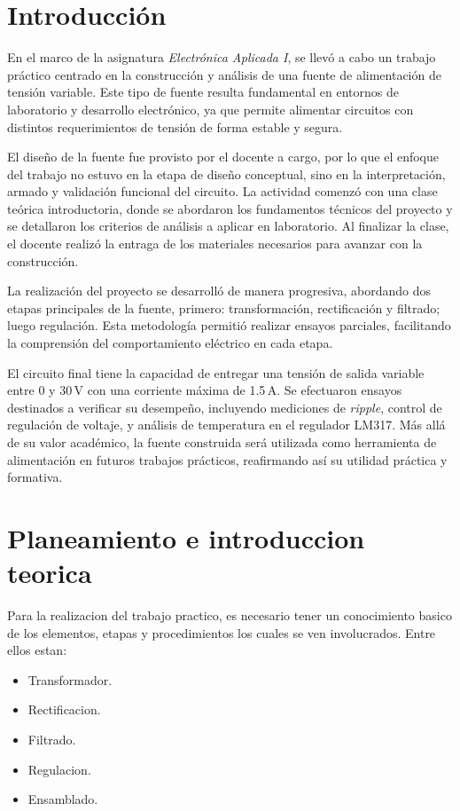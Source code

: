 \documentclass[chaptersright]{informeutn}
\begin{document}
  \maketitle

  \tableofcontents
  \setcounter{page}{1}
  \thispagestyle{plain}

  \chapter{Introducción} 

    En el marco de la asignatura \textit{Electrónica Aplicada I}, se llevó a cabo un trabajo práctico centrado en la
    construcción y análisis de una fuente de alimentación de tensión variable. Este tipo de fuente resulta fundamental
    en entornos de laboratorio y desarrollo electrónico, ya que permite alimentar circuitos con distintos
    requerimientos de tensión de forma estable y segura.

    El diseño de la fuente fue provisto por el docente a cargo, por lo que el enfoque del trabajo no estuvo en la etapa
    de diseño conceptual, sino en la interpretación, armado y validación funcional del circuito. La actividad comenzó
    con una clase teórica introductoria, donde se abordaron los fundamentos técnicos del proyecto y se detallaron los
    criterios de análisis a aplicar en laboratorio. Al finalizar la clase, el docente realizó la entraga de los 
    materiales necesarios para avanzar con la construcción.

    La realización del proyecto se desarrolló de manera progresiva, abordando dos etapas principales de la
    fuente, primero: transformación, rectificación y filtrado; luego regulación. Esta metodología permitió realizar 
    ensayos parciales, facilitando la comprensión del comportamiento eléctrico en cada etapa.

    El circuito final tiene la capacidad de entregar una tensión de salida variable entre 0 y 30\,V con una corriente
    máxima de 1.5\,A. Se efectuaron ensayos destinados a verificar su desempeño, incluyendo mediciones de
    \textit{ripple}, control de regulación de voltaje, y análisis de temperatura en el regulador LM317. Más allá de su
    valor académico, la fuente construida será utilizada como herramienta de alimentación en futuros trabajos
    prácticos, reafirmando así su utilidad práctica y formativa.

  \chapter{Planeamiento e introduccion teorica}
    Para la realizacion del trabajo practico, es necesario tener un conocimiento basico de los elementos, etapas y
    procedimientos los cuales se ven involucrados. Entre ellos estan:
    \begin{itemize}
      \item Transformador.
      \item Rectificacion.
      \item Filtrado.
      \item Regulacion.
      \item Ensamblado.
    \end{itemize}
\end{document}
